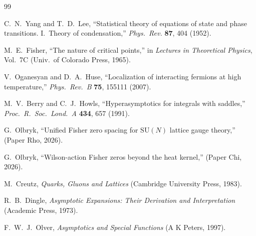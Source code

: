 \documentclass[12pt]{article}
\theoremstyle{definition}
\theoremstyle{remark}
\newcommand{\SU}{\mathrm{SU}}
\begin{document}
\begin{thebibliography}{99}

C.~N.~Yang and T.~D.~Lee,
``Statistical theory of equations of state and phase transitions.
I.~Theory of condensation,''
\emph{Phys.\ Rev.} \textbf{87}, 404 (1952).

M.~E.~Fisher,
``The nature of critical points,''
in \emph{Lectures in Theoretical Physics}, Vol.~7C
(Univ.\ of Colorado Press, 1965).

V.~Oganesyan and D.~A.~Huse,
``Localization of interacting fermions at high temperature,''
\emph{Phys.\ Rev.\ B} \textbf{75}, 155111 (2007).

M.~V.~Berry and C.~J.~Howls,
``Hyperasymptotics for integrals with saddles,''
\emph{Proc.\ R.\ Soc.\ Lond.\ A} \textbf{434}, 657 (1991).

G.~Olbryk,
``Unified Fisher zero spacing for $\SU(N)$ lattice gauge theory,''
(Paper Rho, 2026).

G.~Olbryk,
``Wilson-action Fisher zeros beyond the heat kernel,''
(Paper Chi, 2026).

M.~Creutz,
\emph{Quarks, Gluons and Lattices}
(Cambridge University Press, 1983).

R.~B.~Dingle,
\emph{Asymptotic Expansions: Their Derivation and Interpretation}
(Academic Press, 1973).

F.~W.~J.~Olver,
\emph{Asymptotics and Special Functions}
(A K Peters, 1997).

\end{thebibliography}
\end{document}
